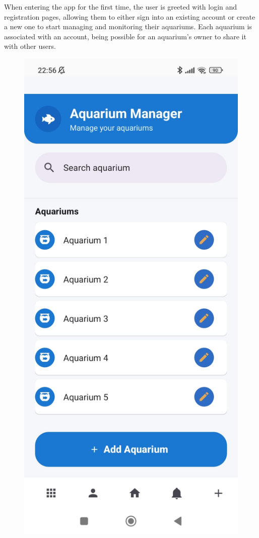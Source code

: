 \documentclass[11pt,a4paper]{article}
\begin{document}
\vspace{2em}
When entering the app for the first time, the user is greeted with login and registration pages, allowing them to either sign into an existing account or create a new one to start managing and monitoring their aquariums. Each aquarium is associated with an account, being possible for an aquarium's owner to share it with other users.

\begin{figure}[H]
    \centering
    \begin{minipage}{0.35\textwidth}
        \centering
        \includegraphics[width=\linewidth]{Images/Homepage.jpeg}

\end{minipage}
\end{figure}
\end{document}
